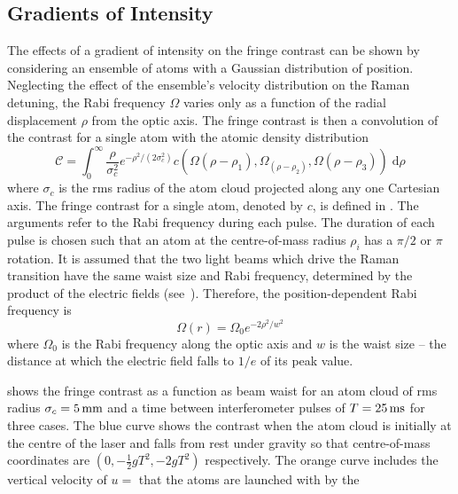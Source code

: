 \subsection{Gradients of Intensity}\label{subsec:fringe_beam_size}
The effects of a gradient of intensity on the fringe contrast can be shown by
considering an ensemble of atoms with a Gaussian
distribution of position. Neglecting the effect of the ensemble's velocity distribution on
the Raman detuning, the Rabi frequency \(\Omega\)
varies only as a function of the radial displacement $\rho$ from the optic axis. The
fringe contrast is then a convolution of the contrast for a
single atom with the atomic density distribution
\begin{equation}
	\mathcal{C} = \int_0^\infty
  \frac{\rho}{\sigma_c^2}e^{-\rho^2/(2\sigma_c^2)}
  c\left(\Omega(\rho-\rho_1),\Omega_(\rho-\rho_2),\Omega(\rho-\rho_3)\right)
  \;\mathrm{d}\rho
	\label{eq:cloud_contrast}
\end{equation}
where \(\sigma_c\) is the rms radius of the atom cloud projected along any one
Cartesian axis. 
The fringe contrast for a single atom, denoted by $c$, is
defined in . The arguments refer to
the Rabi frequency during each pulse. The duration of each pulse is
chosen such that an atom at the centre-of-mass radius $\rho_i$ has a $\pi/2$ or $\pi$
rotation. It is
assumed that the two light beams which drive the Raman transition have the same
waist size and Rabi frequency, determined by the product of the
electric fields (see~). Therefore, the
position-dependent Rabi frequency is
\begin{equation}
	\Omega(r) = \Omega_0 e^{-2 \rho^2/w^2}
\end{equation}
where \(\Omega_0\) is the Rabi frequency along the optic axis and \(w\) is the
waist size -- the distance at which the electric field falls to \(1/e\) of its
peak value. 
\par\noindent
{} shows the fringe contrast as a function as beam waist for an atom cloud of
rms radius \(\sigma_c = \sivalue{5}{\milli\metre}\) and a time between
interferometer pulses of \(T = \sivalue{25}{\milli\second}\) for three
cases. The blue curve shows the contrast when the atom cloud is initially at the
centre of the laser and falls from rest under gravity so that centre-of-mass coordinates are
\(\left(0, -\frac{1}{2}g T^2, -2 g T^2\right)\) respectively. The
orange curve includes the vertical velocity of
$u =$  that the atoms are launched with by the
